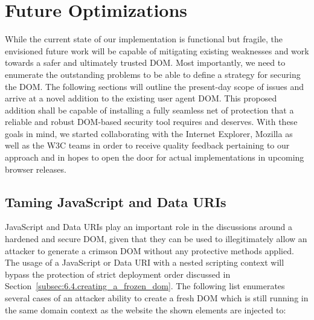   \section{Future Optimizations}
  \label{subsec:6.7.future_optimizations}

      While the current state of our implementation is functional but fragile, the envisioned future work will be capable of mitigating existing weaknesses and work towards a safer and ultimately trusted DOM. Most importantly, we need to enumerate the outstanding problems to be able to define a strategy for securing the DOM. The following sections will outline the present-day scope of issues and arrive at a novel addition to the existing user agent DOM. This proposed addition shall be capable of installing a fully seamless net of protection that a reliable and robust DOM-based security tool requires and deserves. With these goals in mind, we started collaborating with the Internet Explorer, Mozilla as well as the W3C teams in order to receive quality feedback pertaining to our approach and in hopes to open the door for actual implementations in upcoming browser releases. 

    \subsection{Taming JavaScript and Data URIs}
    \label{subsubsec:6.7.2.taming_javascript_uris}

    JavaScript and Data URIs play an important role in the discussions around a hardened and secure DOM, given that they can be used to illegitimately allow an attacker to generate a crimson DOM without any protective methods applied. The usage of a JavaScript or Data URI with a nested scripting context will bypass the protection of strict deployment order discussed in Section~\ref{subsec:6.4.creating_a_frozen_dom}. The following list enumerates several cases of an attacker ability to create a fresh DOM which is still running in the same domain context as the website the shown elements are injected to:

